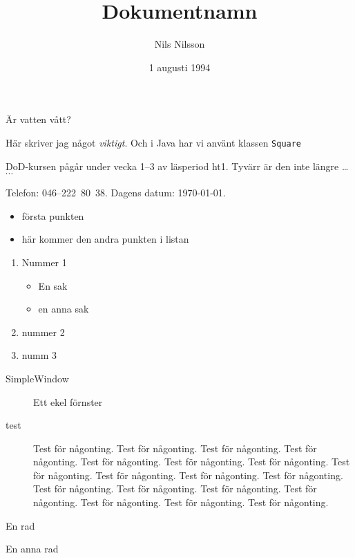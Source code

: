 \documentclass[a4paper]{article}
\title{Dokumentnamn}
\author{Nils Nilsson}
\date{1 augusti 1994}        %
\begin{document}

\maketitle                   %


Är vatten vått?


Här skriver jag något
\emph{viktigt}. Och
i Java har vi använt
klassen \texttt{Square}


DoD-kursen pågår under vecka
1--3 av läsperiod ht1. Tyvärr
är den inte längre \ldots $\cdots$


\quad Telefon: 046--222~80~38.
Dagens datum: \today.



\begin{itemize}
	\item första punkten
	\item här kommer den andra
	punkten i listan
	\end{itemize}

	\begin{enumerate}
		\item Nummer 1
		\begin{itemize}
			\item En sak
			\item en anna sak
		\end{itemize}
		\item nummer 2
		\item numm 3
	\end{enumerate}


\begin{description}
	\item[SimpleWindow] Ett ekel förnster
	\item[test] Test för någonting. Test för någonting. Test för någonting. Test för någonting. Test för någonting. Test för någonting. Test för någonting. Test för någonting. Test för någonting. Test för någonting. Test för någonting. Test för någonting. Test för någonting. Test för någonting. Test för någonting. Test för någonting. Test för någonting. Test för någonting.  
\end{description}

En rad

\vspace{20mm}

En anna rad
\end{document}
